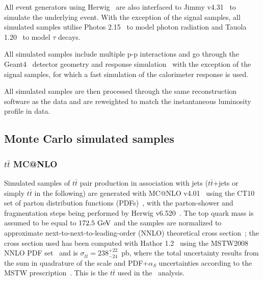 All event generators using {\sc Herwig}~\cite{herwig} are also interfaced to {\sc
Jimmy} v4.31~\cite{jimmy} to simulate the underlying event.  
With the exception of the 
signal samples, all simulated 
samples utilise {\sc Photos 2.15}~\cite{PhotosPaper} to model
photon radiation and {\sc Tauola 1.20}~\cite{TauolaPaper} to model
$\tau$ decays.  

All simulated samples include multiple p-p
interactions and go through the  {\sc Geant4}~\cite{geant}
detector geometry and response simulation~\cite{atlas_sim}
with the exception of the signal samples, for which a fast simulation of
the calorimeter response is used.

All simulated samples are then processed through the same reconstruction 
software as the data and are reweighted to match 
the instantaneous luminosity profile in data. 



\subsection{Monte Carlo simulated samples}\label{sec:MCbkg}

\subsubsection{$t\bar{t}$ MC@NLO}\label{subsec:MC@NLO}
Simulated samples of $t\bar{t}$ pair production  in association with jets 
($t\bar{t}$+jets or simply $t\bar{t}$ in the following)
are generated with {\sc MC@NLO} v4.01~\cite{mcatnlo_1,mcatnlo_2,mcatnlo_3} using the {\sc CT10} set of parton distribution functions (PDFs)~\cite{ct10},
with the parton-shower and fragmentation steps being performed by 
{\sc Herwig} v6.520~\cite{herwig}.
The top quark mass is assumed to be equal to $172.5\gev$ and 
the samples are normalized to approximate next-to-next-to-leading-order 
(NNLO) theoretical cross section~\cite{ttbarxs}; the cross section used 
has been computed with {\sc Hathor} 1.2~\cite{ttbarxs} using the {\sc MSTW2008}
NNLO PDF set~\cite{mstw} and is $\sigma_{t\bar{t}}= 238^{+22}_{-24}$~pb, 
where the total uncertainty results from the sum in quadrature of the 
scale and PDF+$\alpha_S$ uncertainties according to 
the {\sc MSTW} prescription~\cite{mstw2}. 
This is the $t\bar{t}$ used in the \wbx\ analysis.

